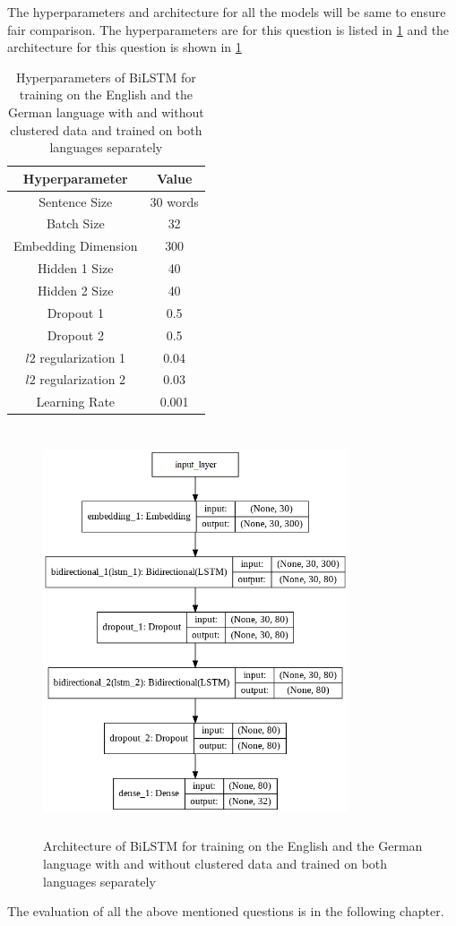The hyperparameters and architecture for all the models will be same to ensure fair comparison. The hyperparameters are for this question is listed in \ref{table:hyperParameterQuestion3} and the architecture for this question is shown in \ref{fig:architectureQuestion3}

\begin{table}[!ht]
\centering
\begin{tabular}{cc}
\hline
\textbf{Hyperparameter} & \textbf{Value} \\ \hline
Sentence Size & 30 words \\
Batch Size & 32 \\
Embedding Dimension & 300 \\
Hidden 1 Size & 40 \\
Hidden 2 Size & 40 \\
Dropout 1 & 0.5 \\
Dropout 2 & 0.5 \\
$l2$ regularization 1 & 0.04 \\
$l2$ regularization 2 & 0.03 \\
Learning Rate & 0.001 \\ \hline
\end{tabular}
\captionsetup{justification=centering,margin=2cm}
\caption{Hyperparameters of \gls{BiLSTM} for training on the English and the German language with and without clustered data and trained on both languages separately}
\label{table:hyperParameterQuestion3}
\end{table}

\begin{figure}[!ht]
    \centering
    \includegraphics[width=9cm, height=12cm]{pics/Question3.png}
    \captionsetup{justification=centering,margin=2cm}
    \caption{Architecture of \gls{BiLSTM} for training on the English and the German language with and without clustered data and trained on both languages separately}
    \label{fig:architectureQuestion3}
\end{figure}

The evaluation of all the above mentioned questions is in the following chapter.